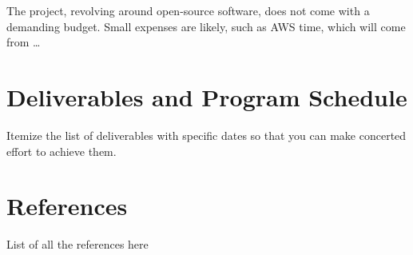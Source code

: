 \documentclass[a4paper,10pt]{article}
\begin{document}
The project, revolving around open-source software, does not come with a demanding budget.
Small expenses are likely, such as AWS time, which will come from  \dots

 
\section{Deliverables and Program Schedule}
Itemize the list of deliverables with specific dates so that you can make
concerted effort to achieve them.

%
%
%
%

\section{References}
List of all the references here
\printbibliography
\end{document}
